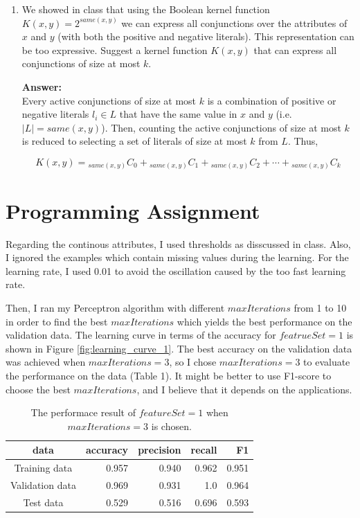 \begin{enumerate}
{\bf Answer:}\\
When both classifiers converge, no more mistakes will be made in the case of the linearly separable dataset. In other words, the training error will be zero for both classifiers.

\item We showed in class that using the Boolean kernel function $K(x, y)=2^{same(x,y)}$ we can express all conjunctions over the attributes of $x$ and $y$ (with both the positive and negative literals). This representation can be too expressive. Suggest a kernel function $K(x, y)$ that can express all conjunctions of size at most $k$.

{\bf Answer:}\\
Every active conjunctions of size at most $k$ is a combination of positive or negative literals $l_i \in L$ that have the same value in $x$ and $y$ (i.e. $|L|=same(x,y)$). Then, counting the active conjunctions of size at most $k$ is reduced to selecting a set of literals of size at most $k$ from $L$. Thus,

\[
K(x, y)={}_{same(x,y)} C _0 + {}_{same(x,y)} C _1 + {}_{same(x,y)} C _2 + \cdots + {}_{same(x,y)} C _k
\]

\end{enumerate}

\section{Programming Assignment}

Regarding the continous attributes, I used thresholds as disscussed in class. Also, I ignored the examples which contain missing values during the learning. For the learning rate, I used 0.01 to avoid the oscillation caused by the too fast learning rate. 

Then, I ran my Perceptron algorithm with different $maxIterations$ from 1 to 10 in order to find the best $maxIterations$ which yields the best performance on the validation data. The learning curve in terms of the accuracy for $featrueSet = 1$  is shown in Figure \ref{fig:learning_curve_1}.  The best accuracy on the validation data was achieved when $maxIterations=3$, so I chose $maxIterations = 3$ to evaluate the performance on the data (Table 1). It might be better to use F1-score to choose the best $maxIterations$, and I believe that it depends on the applications.

\begin{table}[htb]
\centering
  \begin{tabular}{|c|r|r|r|r|} \hline
    data & accuracy & precision & recall & F1 \\ \hline
    Training data & 0.957 & 0.940 & 0.962 & 0.951 \\ \hline
    Validation data & 0.969 & 0.931 & 1.0 & 0.964 \\ \hline
    Test data & 0.529 & 0.516 & 0.696 & 0.593 \\ \hline
  \end{tabular}
  \caption{The performace result of $featureSet = 1$ when $maxIterations = 3$ is chosen.}
\end{table}

